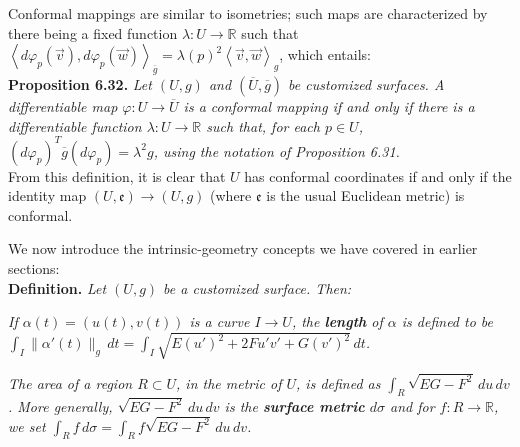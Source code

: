 \documentclass[leqno]{book}
\begin{document}
Conformal mappings are similar to isometries; such maps are characterized by there being a fixed function $\lambda:U\to\mathbb R$ such that $\left<d\varphi_p(\vec v),d\varphi_p(\vec w)\right>_{\overline g}=\lambda(p)^2\left<\vec v,\vec w\right>_g$, which entails:\\

\noindent\textbf{Proposition 6.32.} \emph{Let $(U,g)$ and $(\overline U,\overline g)$ be customized surfaces.  A differentiable map $\varphi:U\to\overline U$ is a conformal mapping if and only if there is a differentiable function $\lambda:U\to\mathbb R$ such that, for each $p\in U$, $(d\varphi_p)^T\overline g(d\varphi_p)=\lambda^2g$, using the notation of Proposition 6.31.}\\

\noindent From this definition, it is clear that $U$ has conformal coordinates if and only if the identity map $(U,\mathfrak e)\to(U,g)$ (where $\mathfrak e$ is the usual Euclidean metric) is conformal.

We now introduce the intrinsic-geometry concepts we have covered in earlier sections:\\

\noindent\textbf{Definition.} \emph{Let $(U,g)$ be a customized surface.  Then:}

\emph{If $\alpha(t)=(u(t),v(t))$ is a curve $I\to U$, the \textbf{length} of $\alpha$ is defined to be $\int_I\|\alpha'(t)\|_g\,dt=\int_I\sqrt{E(u')^2+2Fu'v'+G(v')^2}\,dt$.}

\emph{The area of a region $R\subset U$, in the metric of $U$, is defined as $\int_R\sqrt{EG-F^2}\,du\,dv$.  More generally, $\sqrt{EG-F^2}\,du\,dv$ is the \textbf{surface metric} $d\sigma$ and for $f:R\to\mathbb R$, we set $\int_Rf\,d\sigma=\int_Rf\sqrt{EG-F^2}\,du\,dv$.}
\end{document}
